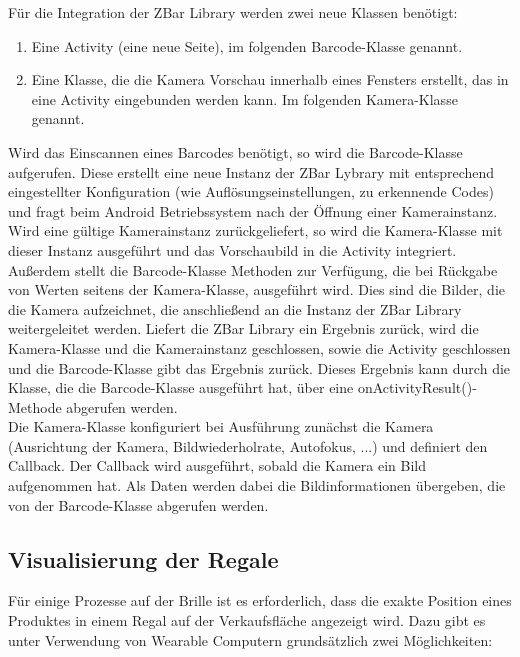 Für die Integration der ZBar Library werden zwei neue Klassen benötigt:
\begin{enumerate}
	\item Eine Activity (eine neue Seite), im folgenden Barcode-Klasse genannt.
	\item Eine Klasse, die die Kamera Vorschau innerhalb eines Fensters erstellt, das in eine Activity eingebunden werden kann. Im folgenden Kamera-Klasse genannt.
\end{enumerate} 
Wird das Einscannen eines Barcodes benötigt, so wird die Barcode-Klasse aufgerufen. Diese erstellt eine neue Instanz der ZBar Lybrary mit entsprechend eingestellter Konfiguration (wie \zB Auflösungseinstellungen, zu erkennende Codes) und fragt beim Android Betriebssystem nach der Öffnung einer Kamerainstanz. Wird eine gültige Kamerainstanz zurückgeliefert, so wird die Kamera-Klasse mit dieser Instanz ausgeführt und das Vorschaubild in die Activity integriert. Außerdem stellt die Barcode-Klasse Methoden zur Verfügung, die bei Rückgabe von Werten seitens der Kamera-Klasse, ausgeführt wird. Dies sind die Bilder, die die Kamera aufzeichnet, die anschließend an die Instanz der ZBar Library weitergeleitet werden. Liefert die ZBar Library ein Ergebnis zurück, wird die Kamera-Klasse und die Kamerainstanz geschlossen, sowie die Activity geschlossen und die Barcode-Klasse gibt das Ergebnis zurück. Dieses Ergebnis kann durch die Klasse, die die Barcode-Klasse ausgeführt hat, über eine onActivityResult()-Methode abgerufen werden.\\

Die Kamera-Klasse konfiguriert bei Ausführung zunächst die Kamera (Ausrichtung der Kamera, Bildwiederholrate, Autofokus, ...) und definiert den Callback. Der Callback wird ausgeführt, sobald die Kamera ein Bild aufgenommen hat. Als Daten werden dabei die Bildinformationen übergeben, die von der Barcode-Klasse abgerufen werden.

\subsection{Visualisierung der Regale}
Für einige Prozesse auf der Brille ist es erforderlich, dass die exakte Position eines Produktes in einem Regal auf der Verkaufsfläche angezeigt wird. Dazu gibt es unter Verwendung von Wearable Computern grundsätzlich zwei Möglichkeiten:

